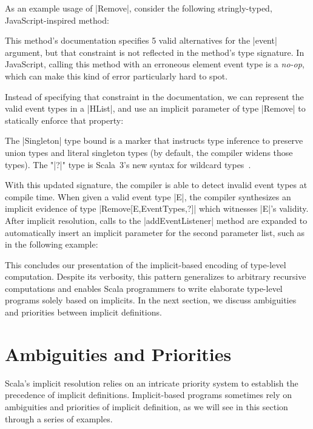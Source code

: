 As an example usage of |Remove|, consider the following stringly-typed, JavaScript-inspired method:

\addEventListenerJS

\noindent
This method's documentation specifies 5 valid alternatives for the |event| argument, but that constraint is not reflected in the method's type signature.
In JavaScript, calling this method with an erroneous element event type is a \emph{no-op}, which can make this kind of error particularly hard to spot.

Instead of specifying that constraint in the documentation, we can represent the valid event types in a |HList|, and use an implicit parameter of type |Remove| to statically enforce that property:

\addEventListenerImplicitDef

\noindent
The |Singleton| type bound is a marker that instructs type inference to preserve union types and literal singleton types (by default, the compiler widens those types).
The "|?|" type is Scala~3's new syntax for wildcard types~\citep[Wildcard Arguments in Types]{odersky2013scala}.

With this updated signature, the compiler is able to detect invalid event types at compile time.
When given a valid event type |E|, the compiler synthesizes an implicit evidence of type |Remove[E,EventTypes,?]| which witnesses |E|'s validity.
After implicit resolution, calls to the |addEventListener| method are expanded to automatically insert an implicit parameter for the second parameter list, such as in the following example:

\addEventListenerImplicitCall

This concludes our presentation of the implicit-based encoding of type-level computation.
Despite its verbosity, this pattern generalizes to arbitrary recursive computations and enables Scala programmers to write elaborate type-level programs solely based on implicits.
In the next section, we discuss ambiguities and priorities between implicit definitions.

\section{Ambiguities and Priorities}

Scala's implicit resolution relies on an intricate priority system to establish the precedence of implicit definitions.
Implicit-based programs sometimes rely on ambiguities and priorities of implicit definition, as we will see in this section through a series of examples.

